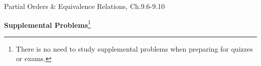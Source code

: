 \documentclass[handout]{mcs}
\begin{document}

\begin{staffnotes}
Partial Orders \& Equivalence Relations, Ch.9.6-9.10
\end{staffnotes}






\begin{center}
\textbf{Supplemental Problems}\footnote{There is no need to study supplemental
  problems when preparing for quizzes or exams.}
\end{center}


\end{document}
